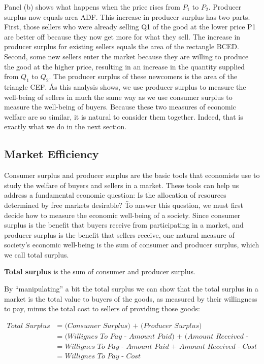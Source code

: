 
Panel (b) shows what happens when the price rises from $P_1$ to $P_2$. Producer surplus now equals area ADF. This
increase in producer surplus has two parts. First, those sellers who were already selling Q1 of the good at the lower
price P1 are better off because they now get more for what they sell. The increase in producer surplus for existing
sellers equals the area of the rectangle BCED. Second, some new sellers enter the market because they are willing to
produce the good at the higher price, resulting in an increase in the quantity supplied from $Q_1$ to $Q_2$. The
producer surplus of these newcomers is the area of the triangle CEF. \v

As this analysis shows, we use producer surplus to measure the well-being of sellers in much the same way as we use
consumer surplus to measure the well-being of buyers. Because these two measures of economic welfare are so similar,
it is natural to consider them together. Indeed, that is exactly what we do in the next section.

\subsection{Market Efficiency}

Consumer surplus and producer surplus are the basic tools that economists use to study the welfare of buyers and
sellers in a market. These tools can help us address a fundamental economic question: Is the allocation of resources
determined by free markets desirable? \v

To answer this question, we must first decide how to measure the economic well-being of a society. Since consumer
surplus is the benefit that buyers receive from participating in a market, and producer surplus is the benefit that
sellers receive, one natural measure of society's economic well-being is the sum of consumer and producer surplus,
which we call total surplus.

\textbf{Total surplus} is the sum of consumer and producer surplus.
\ed

By ``manipulating'' a bit the total surplus we can show that the total surplus in a market is the total value to
buyers of the goods, as measured by their willingness to pay, minus the total cost to sellers of providing those goods:

\begin{align}
\textit{Total Surplus } & \textit{= (Consumer Surplus) + (Producer Surplus)} \nonumber \\
& \textit{= (Willignes To Pay - Amount Paid) + (Amount Received - Cost)} \nonumber \\
& \textit{= Willignes To Pay - Amount Paid + Amount Received - Cost} \nonumber \\
& \textit{= Willignes To Pay - Cost} \nonumber
\end{align}

